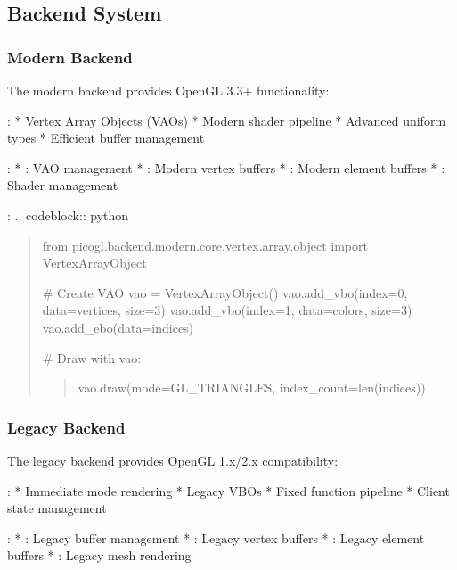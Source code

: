 \documentclass[a4paper,10pt,english,openany,oneside]{sphinxmanual}
\begin{document}
\subsection{Backend System}
\label{\detokenize{development:backend-system}}

\subsubsection{Modern Backend}
\label{\detokenize{development:modern-backend}}
\sphinxAtStartPar
The modern backend provides OpenGL 3.3+ functionality:

\sphinxAtStartPar
{}:
* Vertex Array Objects (VAOs)
* Modern shader pipeline
* Advanced uniform types
* Efficient buffer management

\sphinxAtStartPar
{}:
* : VAO management
* : Modern vertex buffers
* : Modern element buffers
* : Shader management

\sphinxAtStartPar
{}:
.. code\sphinxhyphen{}block:: python
\begin{quote}

\sphinxAtStartPar
from picogl.backend.modern.core.vertex.array.object import VertexArrayObject

\sphinxAtStartPar
\# Create VAO
vao = VertexArrayObject()
vao.add\_vbo(index=0, data=vertices, size=3)
vao.add\_vbo(index=1, data=colors, size=3)
vao.add\_ebo(data=indices)

\sphinxAtStartPar
\# Draw
with vao:
\begin{quote}

\sphinxAtStartPar
vao.draw(mode=GL\_TRIANGLES, index\_count=len(indices))
\end{quote}
\end{quote}


\subsubsection{Legacy Backend}
\label{\detokenize{development:legacy-backend}}
\sphinxAtStartPar
The legacy backend provides OpenGL 1.x/2.x compatibility:

\sphinxAtStartPar
{}:
* Immediate mode rendering
* Legacy VBOs
* Fixed function pipeline
* Client state management

\sphinxAtStartPar
{}:
* : Legacy buffer management
* : Legacy vertex buffers
* : Legacy element buffers
* : Legacy mesh rendering
\end{document}
